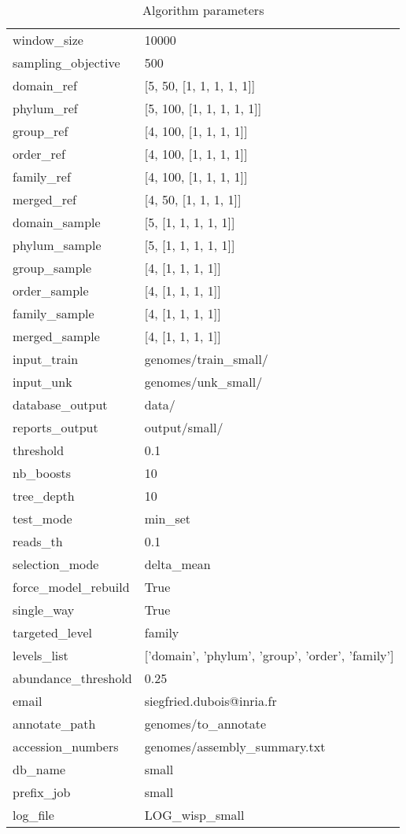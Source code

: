 \documentclass[12pt]{article}
\begin{document}
\begin{table}[htp]
\begin{tabular}{ll}
window\_size & 10000 \\
sampling\_objective & 500 \\
domain\_ref & [5, 50, [1, 1, 1, 1, 1]] \\
phylum\_ref & [5, 100, [1, 1, 1, 1, 1]] \\
group\_ref & [4, 100, [1, 1, 1, 1]] \\
order\_ref & [4, 100, [1, 1, 1, 1]] \\
family\_ref & [4, 100, [1, 1, 1, 1]] \\
merged\_ref & [4, 50, [1, 1, 1, 1]] \\
domain\_sample & [5, [1, 1, 1, 1, 1]] \\
phylum\_sample & [5, [1, 1, 1, 1, 1]] \\
group\_sample & [4, [1, 1, 1, 1]] \\
order\_sample & [4, [1, 1, 1, 1]] \\
family\_sample & [4, [1, 1, 1, 1]] \\
merged\_sample & [4, [1, 1, 1, 1]] \\
input\_train & genomes/train\_small/ \\
input\_unk & genomes/unk\_small/ \\
database\_output & data/ \\
reports\_output & output/small/ \\
threshold & 0.1 \\
nb\_boosts & 10 \\
tree\_depth & 10 \\
test\_mode & min\_set \\
reads\_th & 0.1 \\
selection\_mode & delta\_mean \\
force\_model\_rebuild & True \\
single\_way & True \\
targeted\_level & family \\
levels\_list & ['domain', 'phylum', 'group', 'order', 'family'] \\
abundance\_threshold & 0.25 \\
email & siegfried.dubois@inria.fr \\
annotate\_path & genomes/to\_annotate \\
accession\_numbers & genomes/assembly\_summary.txt \\
db\_name & small \\
prefix\_job & small \\
log\_file & LOG\_wisp\_small
\end{tabular}
\caption*{Algorithm parameters}
\end{table}
\clearpage
\pagebreak[4]
\end{document}
